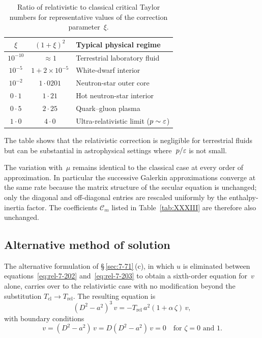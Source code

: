\begin{table}[htbp]
\centering
\caption{Ratio of relativistic to classical critical Taylor numbers
for representative values of the correction parameter~$\xi$.}
\label{tab:rel-XXXII}
\begin{tabular}{ccl}
\hline
$\xi$ & $(1+\xi)^{2}$ &
  Typical physical regime \\
\hline
$10^{-10}$ & $\approx 1$ &
  Terrestrial laboratory fluid \\
$10^{-5}$ & $1 + 2\times 10^{-5}$ &
  White-dwarf interior \\
$10^{-2}$ & $1{\cdot}0201$ &
  Neutron-star outer core \\
$0{\cdot}1$ & $1{\cdot}21$ &
  Hot neutron-star interior \\
$0{\cdot}5$ & $2{\cdot}25$ &
  Quark--gluon plasma \\
$1{\cdot}0$ & $4{\cdot}0$ &
  Ultra-relativistic limit ($p \sim \varepsilon$) \\
\hline
\end{tabular}
\end{table}

The table shows that the relativistic correction is negligible for
terrestrial fluids but can be substantial in astrophysical settings
where~$p/\varepsilon$ is not small.

The variation with~$\mu$ remains identical to the classical case at
every order of approximation.  In particular the successive Galerkin
approximations converge at the same rate because the matrix
structure of the secular equation is unchanged; only the diagonal
and off-diagonal entries are rescaled uniformly by the
enthalpy-inertia factor.  The coefficients $\mathscr{C}_{m}$ listed
in Table~\ref{tab:XXXIII} are therefore also unchanged.

\subsection{Alternative method of solution}\label{sec:rel-71-alternative}

The alternative formulation of \S\,\ref{sec:7-71}\,(c), in which
$u$ is eliminated between equations~\eqref{eq:rel-7-202}
and~\eqref{eq:rel-7-203} to obtain a sixth-order equation for~$v$
alone, carries over to the relativistic case with no modification
beyond the substitution $T_{\mathrm{cl}} \to T_{\mathrm{rel}}$.
The resulting equation is
\begin{equation}
\label{eq:rel-7-220}
(D^{2}-a^{2})^{3}\,v = -T_{\mathrm{rel}}\,a^{2}(1+\alpha\,\zeta)\,v,
\end{equation}
with boundary conditions
\begin{equation}
\label{eq:rel-7-221}
v = (D^{2}-a^{2})\,v = D(D^{2}-a^{2})\,v = 0
\quad\text{for } \zeta = 0 \text{ and } 1.
\end{equation}

